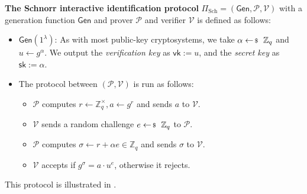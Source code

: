 \documentclass[../lecture-notes-148x210.tex]{subfiles}
\begin{document}
\begin{definition}
    \textbf{The Schnorr interactive identification protocol} $\Pi_{\text{Sch}} = (\mathsf{Gen}, \mathcal{P}, \mathcal{V})$ \cite{schnorr1989} with a generation function $\mathsf{Gen}$ and prover $\mathcal{P}$ and verifier $\mathcal{V}$ is defined as follows:
    \begin{itemize}
        \item $\mathsf{Gen}(1^{\lambda})$: As with most public-key cryptosystems, we take $\alpha \leftarrowS \mathbb{Z}_q$ and $u \gets g^{\alpha}$. We output the \textit{verification key} as $\mathsf{vk} := u$, and the \textit{secret key} as $\mathsf{sk} := \alpha$.
        \item The protocol between $(\mathcal{P},\mathcal{V})$ is run as follows:
        \begin{itemize}
            \item $\mathcal{P}$ computes $r \gets \mathbb{Z}_q^{\times}, a \gets g^{r}$ and sends $a$ to $\mathcal{V}$.
            \item $\mathcal{V}$ sends a random challenge $e \leftarrowS \mathbb{Z}_q$ to $\mathcal{P}$.
            \item $\mathcal{P}$ computes $\sigma \gets r + \alpha e \in \mathbb{Z}_q$ and sends $\sigma$ to $\mathcal{V}$.
            \item $\mathcal{V}$ accepts if $g^{\sigma} = a \cdot u^e$, otherwise it rejects.
        \end{itemize}
    \end{itemize}

    This protocol is illustrated in . 
\end{definition}
\end{document}
